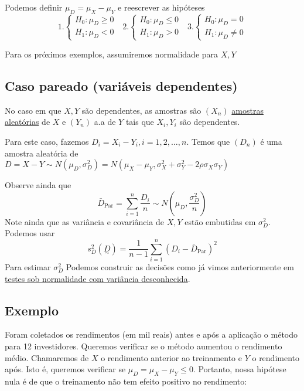\documentclass[
  letterpaper,
  DIV=11,
  numbers=noendperiod]{scrreprt}
\begin{document}
Podemos definir \(\mu_{D}=\mu_{X}-\mu_{Y}\) e reescrever as hipóteses \[
1.
\begin{cases}
H_{0}:\mu_{D} \geq 0 \\
H_{1}: \mu_{D} < 0
\end{cases} ~~~2.
\begin{cases}
H_{0}:\mu_{D} \leq 0 \\
H_{1}: \mu_{D} > 0
\end{cases} ~~~3.
\begin{cases}
H_{0}:\mu_{D} = 0 \\
H_{1}: \mu_{D} \neq 0
\end{cases}
\]

Para os próximos exemplos, assumiremos normalidade para \(X,Y\)

\subsection{Caso pareado (variáveis
dependentes)}\label{caso-pareado-variuxe1veis-dependentes}

No caso em que \(X,Y\) são dependentes, as amostras são \((X_{n})\)
\hyperref[sec-aa]{amostras aleatórias} de \(X\) e \((Y_{n})\) a.a de
\(Y\) tais que \(X_{i},Y_{i}\) são dependentes.

Para este caso, fazemos \(D_{i}=X_{i}-Y_{i},i=1,2,\dots, n\). Temos que
\((D_{n})\) é uma amostra aleatória de
\(D=X-Y \sim N(\mu_{D},\sigma^2_{D})=N(\mu_{X}-\mu_{Y},\sigma^2_{X}+\sigma^2_{Y}-2 \rho\sigma_{X}\sigma _{Y})\)

Observe ainda que \[
\bar{D}_{\mathrm{Par}}=\sum^{n}_{i=1} \frac{D_{i}}{n} \sim N\left( \mu_{D}, \frac{\sigma^2_{D}}{n} \right)
\] Note ainda que as variância e covariância de \(X,Y\) estão embutidas
em \(\sigma^2_{D}\). Podemos usar \[
s^2_{D}(\underset{\sim}{D})=\frac{1}{n-1}\sum^n_{i=1}(D_{i}-\bar{D}_{\mathrm{Par}})^2
\] Para estimar \(\sigma^2_{D}\) Podemos construir as decisões como já
vimos anteriormente em \hyperref[sec-normalidade-vardesc]{testes sob
normalidade com variância desconhecida}.

\subsection{Exemplo}\label{exemplo-8}

Foram coletados os rendimentos (em mil reais) antes e após a aplicação o
método para 12 investidores. Queremos verificar se o método aumentou o
rendimento médio. Chamaremos de \(X\) o rendimento anterior ao
treinamento e \(Y\) o rendimento após. Isto é, queremos verificar se
\(\mu_{D}=\mu_{X}-\mu_{Y}\leq 0\). Portanto, nossa hipótese nula é de
que o treinamento não tem efeito positivo no rendimento:
\end{document}
